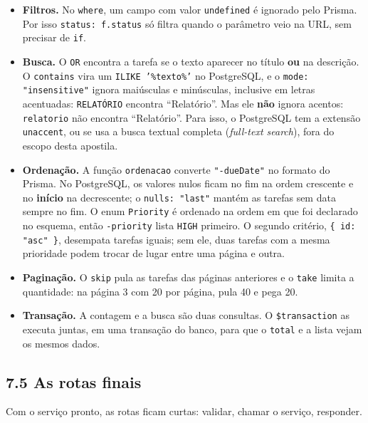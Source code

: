 \begin{itemize}
  \item \textbf{Filtros.} No \texttt{where}, um campo com valor \texttt{undefined} é ignorado pelo Prisma. Por isso \texttt{status: f.status} só filtra quando o parâmetro veio na URL, sem precisar de \texttt{if}.
  \item \textbf{Busca.} O \texttt{OR} encontra a tarefa se o texto aparecer no título \textbf{ou} na descrição. O \texttt{contains} vira um \texttt{ILIKE '\%texto\%'} no PostgreSQL, e o \texttt{mode: "insensitive"} ignora maiúsculas e minúsculas, inclusive em letras acentuadas: \texttt{RELATÓRIO} encontra ``Relatório''. Mas ele \textbf{não} ignora acentos: \texttt{relatorio} não encontra ``Relatório''. Para isso, o PostgreSQL tem a extensão \texttt{unaccent}, ou se usa a busca textual completa (\textit{full-text search}), fora do escopo desta apostila.
  \item \textbf{Ordenação.} A função \texttt{ordenacao} converte \texttt{"-dueDate"} no formato do Prisma. No PostgreSQL, os valores nulos ficam no fim na ordem crescente e no \textbf{início} na decrescente; o \texttt{nulls: "last"} mantém as tarefas sem data sempre no fim. O enum \texttt{Priority} é ordenado na ordem em que foi declarado no esquema, então \texttt{-priority} lista \texttt{HIGH} primeiro. O segundo critério, \texttt{\{ id: "asc" \}}, desempata tarefas iguais; sem ele, duas tarefas com a mesma prioridade podem trocar de lugar entre uma página e outra.
  \item \textbf{Paginação.} O \texttt{skip} pula as tarefas das páginas anteriores e o \texttt{take} limita a quantidade: na página 3 com 20 por página, pula 40 e pega 20.
  \item \textbf{Transação.} A contagem e a busca são duas consultas. O \texttt{\$transaction} as executa juntas, em uma transação do banco, para que o \texttt{total} e a lista vejam os mesmos dados.
\end{itemize}

\subsection{7.5 As rotas finais}

Com o serviço pronto, as rotas ficam curtas: validar, chamar o serviço, responder.

